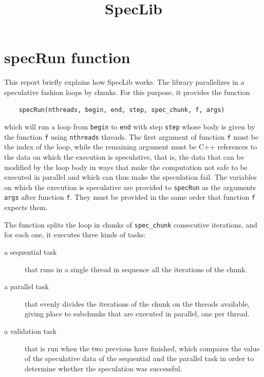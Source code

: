 \documentclass[11pt,a4paper]{article}
\begin{document}
	
	\title {SpecLib}
	
	\maketitle
	
	\section{specRun function}
	
	This report briefly explains how SpecLib works. The library parallelizes in a speculative fashion loops by chunks. For this purpose, it provides the function
	
	\begin{verbatim}
	specRun(nthreads, begin, end, step, spec_chunk, f, args)
	\end{verbatim}
	
	\noindent which will run a loop from {\tt begin} to {\tt end} with step {\tt step} whose body is given by the function {\tt f} using {\tt nthreads} threads. The first argument of function {\tt f} must be the index of the loop, while the remaining argument must be C++ references to the data on which the execution is speculative, that is, the data that can be modified by the loop body in ways that make the computation not safe to be executed in parallel and which can thus make the speculation fail. The variables on which the execution is speculative are provided to {\tt specRun} as the arguments {\tt args} after function {\tt f}. They must be provided in the same order that function {\tt f} expects them.
	
	The function splits the loop in chunks of {\tt spec\_chunk} consecutive iterations, and for each one, it executes three kinds of tasks:
	\begin{description}
		\item[a sequential task] that runs in a single thread in sequence all the iterations of the chunk.
		\item[a parallel task] that evenly divides the iterations of the chunk on the threads available, giving place to subchunks that are executed in parallel, one per thread.
		\item[a validation task] that is run when the two previous have finished, which compares the value of the speculative data of the sequential and the parallel task in order to determine whether the speculation was successful.
	\end{description}
	
\end{document}
